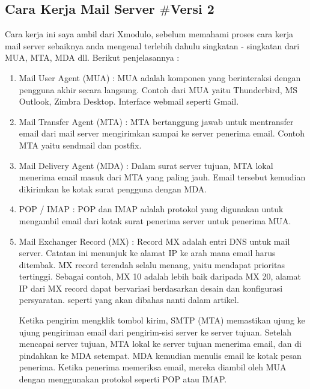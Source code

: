\subsection {Cara Kerja Mail Server  $  \#  $Versi 2} \par
Cara kerja ini saya ambil dari Xmodulo, sebelum memahami proses cara kerja mail server sebaiknya anda mengenal terlebih dahulu singkatan - singkatan dari MUA, MTA, MDA dll. Berikut penjelasannya : \par
\vspace{12pt}
\noindent 
\begin{enumerate}
\item Mail User Agent (MUA) : MUA adalah komponen yang berinteraksi dengan pengguna akhir secara langsung. Contoh dari MUA yaitu Thunderbird, MS Outlook, Zimbra Desktop. Interface webmail seperti Gmail. \par
\noindent 
\item Mail Transfer Agent (MTA) : MTA bertanggung jawab untuk mentransfer email dari mail server mengirimkan sampai ke server penerima email. Contoh MTA yaitu sendmail dan postfix. \par
\noindent 
\item Mail Delivery Agent (MDA) : Dalam surat server tujuan, MTA lokal menerima email masuk dari MTA yang paling jauh. Email tersebut kemudian dikirimkan ke kotak surat pengguna dengan MDA. \par
\noindent 
\item POP / IMAP : POP dan IMAP adalah protokol yang digunakan untuk mengambil email dari kotak surat penerima server untuk penerima MUA. \par
\noindent 
\item Mail Exchanger Record (MX) : Record MX adalah entri DNS untuk mail server. Catatan ini menunjuk ke alamat IP ke arah mana email harus ditembak. MX record terendah selalu menang, yaitu mendapat prioritas tertinggi. Sebagai contoh, MX 10 adalah lebih baik daripada MX 20, alamat IP dari MX record dapat bervariasi berdasarkan desain dan konfigurasi persyaratan. seperti yang akan dibahas nanti dalam artikel. \par
Ketika pengirim mengklik tombol kirim, SMTP (MTA) memastikan ujung ke ujung pengiriman email dari pengirim-sisi server ke server tujuan. Setelah mencapai server tujuan, MTA lokal ke server tujuan menerima email, dan di pindahkan ke MDA setempat. MDA kemudian menulis email ke kotak pesan penerima. Ketika penerima memeriksa email, mereka diambil oleh MUA dengan menggunakan protokol seperti POP atau IMAP. \par
\end{enumerate}
\vspace{12pt}
\vspace{12pt}
